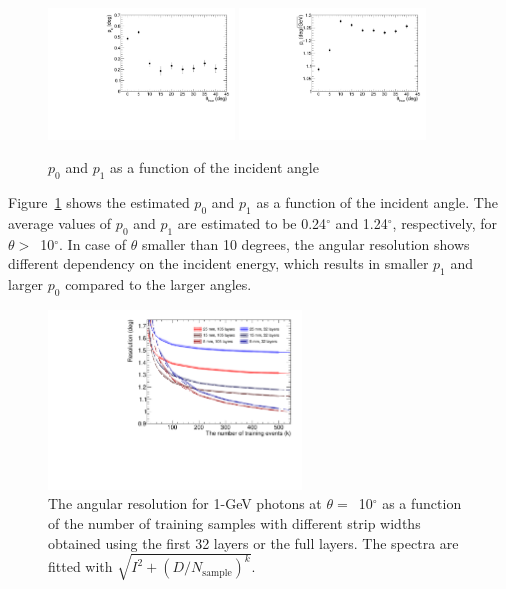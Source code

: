 \documentclass[12pt,times,draftclsnofoot,a4paper]{elsarticle}
\begin{document}
\begin{figure}[!hbt]
\centering
\includegraphics[width=0.44\textwidth]{Fig7_p0.pdf}
\includegraphics[width=0.44\textwidth]{Fig7_p1.pdf}
\caption{ $p_{0}$ and $p_{1}$ as a function of the incident angle }
\label{fig:res_edep}
\end{figure}

Figure~\ref{fig:res_edep} shows the estimated $p_{0}$ and $p_{1}$ as a function of the incident angle. The average values of $p_{0}$ and $p_{1}$ are estimated to be 0.24$^{\circ}$ and 1.24$^{\circ}$, respectively, for $\theta>$~10$^{\circ}$. 
In case of $\theta$ smaller than 10 degrees, the angular resolution shows different dependency on the incident energy, which results in smaller $p_{1}$ and larger $p_{0}$ compared to the larger angles.

\begin{figure}[!hbt]
\centering
\includegraphics[width=0.6\textwidth]{Fig8_nsample_400k_500k.pdf}
\caption{ The angular resolution for 1-GeV photons at $\theta=$~10$^{\circ}$ as a function of the number of training samples with different strip widths obtained using the first 32 layers or the full layers. The spectra are fitted with $\sqrt{I^{2} + (D/N_{\mathrm{sample}})^{k}}$. }
\label{fig:multi-parameter}
\end{figure}
\end{document}
